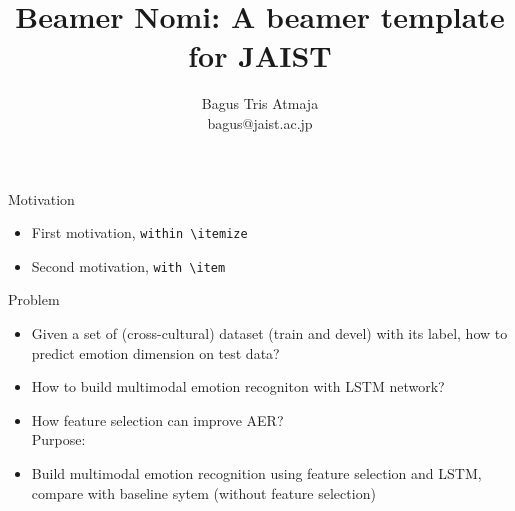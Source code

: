 \documentclass{beamer}
\author{Bagus Tris Atmaja \\ 
        bagus@jaist.ac.jp}
\title{\LARGE{Beamer Nomi: \vspace{5pt}
            \newline A beamer template for JAIST }}
\institute{AIS-Lab \\ School of Information Science \\ JAIST}
\begin{document}
\begin{frame}[t,plain]
\titlepage
\end{frame}


\begin{frame}[t, fragile]{Motivation}
\begin{itemize}
  \item First motivation, \verb|within \itemize|
  \item Second motivation, \verb|with \item|
\end{itemize}
\end{frame}

\begin{frame}{Problem}
\begin{itemize}
\item   Given a set of (cross-cultural) dataset (train and devel) with its label, 
        how to predict emotion dimension on test data?
\item   How to build multimodal emotion recogniton with LSTM network?
\item   How feature selection can improve AER? \\
\vspace{5pt}
Purpose: \\
\item Build multimodal emotion recognition using feature selection and LSTM, compare 
with baseline sytem (without feature selection)
\end{itemize}
\end{frame}

\end{document}
